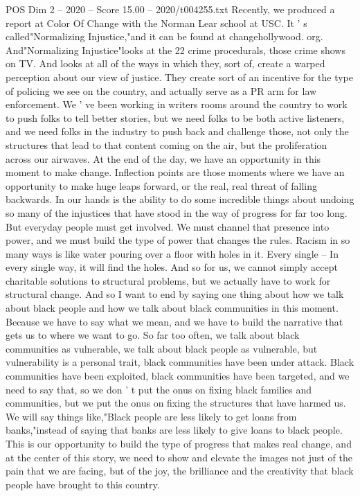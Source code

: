 \begin{textsample}{POS Dim 2 – 2020 – Score 15.00 – 2020/t004255.txt}
Recently, we produced a report at Color Of Change with the Norman Lear school at USC.
It ' s called"Normalizing Injustice,"and it can be found at changehollywood. org.
And"Normalizing Injustice"looks at the 22 crime procedurals, those crime shows on TV.
And looks at all of the ways in which they, sort of, create a warped perception about our view of justice.
They create sort of an incentive for the type of policing we see on the country, and actually serve as a PR arm for law enforcement.
We ' ve been working in writers rooms around the country to work to push folks to tell better stories, but we need folks to be both active listeners, and we need folks in the industry to push back and challenge those, not only the structures that lead to that content coming on the air, but the proliferation across our airwaves.
At the end of the day, we have an opportunity in this moment to make change.
Inflection points are those moments where we have an opportunity to make huge leaps forward, or the real, real threat of falling backwards.
In our hands is the ability to do some incredible things about undoing so many of the injustices that have stood in the way of progress for far too long.
But everyday people must get involved.
We must channel that presence into power, and we must build the type of power that changes the rules.
Racism in so many ways is like water pouring over a floor with holes in it.
Every single -- In every single way, it will find the holes.
And so for us, we cannot simply accept charitable solutions to structural problems, but we actually have to work for structural change.
And so I want to end by saying one thing about how we talk about black people and how we talk about black communities in this moment.
Because we have to say what we mean, and we have to build the narrative that gets us to where we want to go.
So far too often, we talk about black communities as vulnerable, we talk about black people as vulnerable, but vulnerability is a personal trait, black communities have been under attack.
Black communities have been exploited, black communities have been targeted, and we need to say that, so we don ' t put the onus on fixing black families and communities, but we put the onus on fixing the structures that have harmed us.
We will say things like,"Black people are less likely to get loans from banks,"instead of saying that banks are less likely to give loans to black people.
This is our opportunity to build the type of progress that makes real change, and at the center of this story, we need to show and elevate the images not just of the pain that we are facing, but of the joy, the brilliance and the creativity that black people have brought to this country.

\end{textsample}

